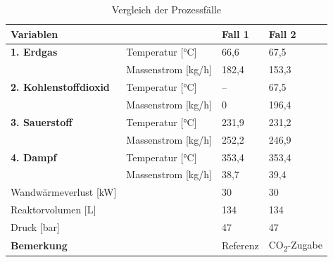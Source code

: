         \begin{table}[H]
            \centering
            \caption{Vergleich der Prozessfälle \cite{gonzales}}
            \label{tab:rahmenbedingungen_versuche}
            \begin{tabular}{llll}
            \toprule
            \textbf{Variablen} & & \textbf{Fall 1} & \textbf{Fall 2} \\
            \midrule
            \textbf{1. Erdgas} & Temperatur [°C] & 66,6 & 67,5 \\
                               & Massenstrom [kg/h] & 182,4 & 153,3 \\
            \midrule
            \textbf{2. Kohlenstoffdioxid} & Temperatur [°C] & -- & 67,5 \\
                                     & Massenstrom [kg/h] & 0 & 196,4 \\
            \midrule
            \textbf{3. Sauerstoff} & Temperatur [°C] & 231,9 & 231,2 \\
                                   & Massenstrom [kg/h] & 252,2 & 246,9 \\
            \midrule
            \textbf{4. Dampf} & Temperatur [°C] & 353,4 & 353,4 \\
                              & Massenstrom [kg/h] & 38,7 & 39,4 \\
            \midrule
            Wandwärmeverlust [kW] & & 30 & 30 \\
            Reaktorvolumen [L] & & 134 & 134 \\
            Druck [bar] && 47 & 47\\
            \midrule
            \textbf{Bemerkung} & & Referenz & CO\textsubscript{2}-Zugabe \\
            \bottomrule
            \end{tabular}
        \end{table}
        
